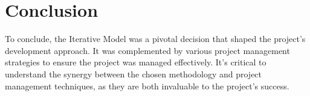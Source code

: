 \section{Conclusion}

To conclude, the Iterative Model was a pivotal decision that shaped the project's development approach. It was complemented by various project management strategies  to ensure the project was managed effectively. It's critical to understand the synergy between the chosen methodology and project management techniques, as they are both invaluable to the project's success.
